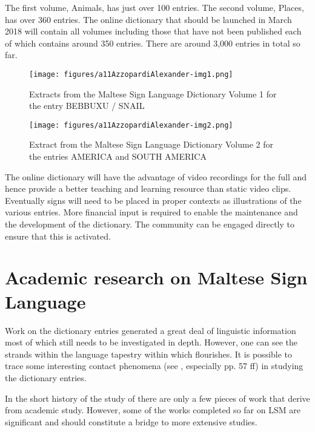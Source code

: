 \documentclass[output=paper]{langsci/langscibook}
\begin{document}
The first volume, Animals, has just over 100 entries. The second
volume, Places, has over 360 entries.  The online dictionary that
should be launched in March 2018 will contain all volumes
including those that have not been published each of which contains
around 350 entries.  There are around 3,000 entries in total so far.

  
\begin{figure}[p]  
\texttt{[image: figures/a11AzzopardiAlexander-img1.png]}
 \caption{\label{fig:azzopardi:azz1} Extracts from the Maltese Sign Language Dictionary Volume 1 \citep{a03} for the entry BEBBUXU / SNAIL}

\end{figure}

\begin{figure}[p]
\texttt{[image: figures/a11AzzopardiAlexander-img2.png]}
 \caption{\label{fig:azzopardi:azz2} Extract from the Maltese Sign Language Dictionary Volume  2 \citep{a04} for the entries AMERICA and SOUTH AMERICA}
 
\end{figure}


The online dictionary will have the advantage of video recordings for
the full  and hence provide a better teaching and learning
resource than static video clips.  Eventually signs will need to be
placed in proper contexts as illustrations of the various entries.
More financial input is required to enable the maintenance and the
development of the dictionary.  The  community can be engaged
directly to ensure that this is activated.

\section{Academic research on Maltese Sign Language}

Work on the dictionary entries generated a great deal of linguistic
information most of which still needs to be investigated in depth.
However, one can see the strands within the language tapestry within
which  flourishes.  It is possible to trace some
interesting contact phenomena (see \citealt{aa15},
especially pp. 57 ff) in studying the dictionary entries.

In the short history of the study of  there are
only a few pieces of work that derive from academic study.  However,
some of the works completed so far on LSM are significant and should
constitute a bridge to more extensive studies.
\end{document}
